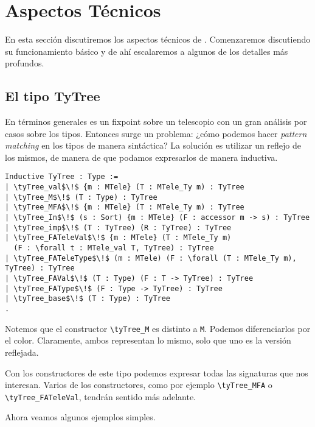\chapter{Aspectos Técnicos}\label{ch:technical}

En esta sección discutiremos los aspectos técnicos de \lift.
Comenzaremos discutiendo su funcionamiento básico y de ahí escalaremos a algunos de los detalles más profundos. 

\section{El tipo TyTree}

En términos generales \lift es un fixpoint sobre un telescopio con un gran análisis por casos sobre los tipos.
Entonces surge un problema: ¿cómo podemos hacer \textit{pattern matching} en los tipos de manera sintáctica?
La solución es utilizar un reflejo de los mismos, de manera de que podamos expresarlos de manera inductiva.

\begin{lstlisting}[float=h,frame=tb,caption={El tipo inductivo \lstinline{TyTree}},label=lst:tytree]
Inductive TyTree : Type :=
| \tyTree_val$\!$ {m : MTele} (T : MTele_Ty m) : TyTree
| \tyTree_M$\!$ (T : Type) : TyTree
| \tyTree_MFA$\!$ {m : MTele} (T : MTele_Ty m) : TyTree
| \tyTree_In$\!$ (s : Sort) {m : MTele} (F : accessor m -> s) : TyTree
| \tyTree_imp$\!$ (T : TyTree) (R : TyTree) : TyTree
| \tyTree_FATeleVal$\!$ {m : MTele} (T : MTele_Ty m)
  (F : \forall t : MTele_val T, TyTree) : TyTree
| \tyTree_FATeleType$\!$ (m : MTele) (F : \forall (T : MTele_Ty m), TyTree) : TyTree
| \tyTree_FAVal$\!$ (T : Type) (F : T -> TyTree) : TyTree
| \tyTree_FAType$\!$ (F : Type -> TyTree) : TyTree
| \tyTree_base$\!$ (T : Type) : TyTree
.
\end{lstlisting}

Notemos que el constructor \lstinline{\tyTree_M} es distinto a \lstinline{M}. Podemos diferenciarlos por el color. Claramente, ambos representan lo mismo, solo que uno es la versión reflejada.

Con los constructores de este tipo podemos expresar todas las signaturas que nos interesan. Varios de los constructores, como por ejemplo \lstinline{\tyTree_MFA} o \lstinline{\tyTree_FATeleVal}, tendrán sentido más adelante.

Ahora veamos algunos ejemplos simples.

